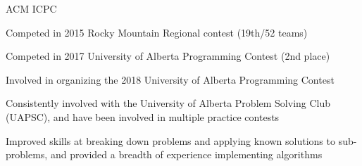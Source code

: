 \begin{cventries}
  \cventry
    {}
    {ACM ICPC}
    {}
    {}
    {
      \begin{cvitems}
      \item {Competed in 2015 Rocky Mountain Regional contest (19th/52 teams)}
      \item {Competed in 2017 University of Alberta Programming Contest (2nd place)}
      \item {Involved in organizing the 2018 University of Alberta Programming Contest}
      \item {Consistently involved with the University of Alberta Problem Solving Club (UAPSC),
        and have been involved in multiple practice contests}
      \item {Improved skills at breaking down problems and applying known solutions to sub-problems, and provided
        a breadth of experience implementing algorithms}
      \end{cvitems}
    }

\end{cventries}
